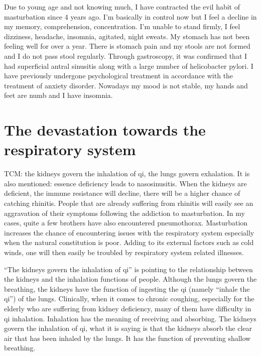 \documentclass[
]{book}
\begin{document}
Due to young age and not knowing much, I have contracted the evil habit of masturbation since 4 years ago. I'm basically in control now but I feel a decline in my memory, comprehension, concentration. I'm unable to stand firmly, I feel dizziness, headache, insomnia, agitated, night sweats. My stomach has not been feeling well for over a year. There is stomach pain and my stools are not formed and I do not pass stool regularly. Through gastroscopy, it was confirmed that I had superficial antral sinusitis along with a large number of helicobacter pylori. I have previously undergone psychological treatment in accordance with the treatment of anxiety disorder. Nowadays my mood is not stable, my hands and feet are numb and I have insomnia.

\hypertarget{the-devastation-towards-the-respiratory-system}{%
\section{The devastation towards the respiratory system}\label{the-devastation-towards-the-respiratory-system}}

TCM: the kidneys govern the inhalation of qi, the lungs govern exhalation. It is also mentioned: essence deficiency leads to nasosinusitis. When the kidneys are deficient, the immune resistance will decline, there will be a higher chance of catching rhinitis. People that are already suffering from rhinitis will easily see an aggravation of their symptoms following the addiction to masturbation. In my cases, quite a few brothers have also encountered pneumothorax. Masturbation increases the chance of encountering issues with the respiratory system especially when the natural constitution is poor. Adding to its external factors such as cold winds, one will then easily be troubled by respiratory system related illnesses.

``The kidneys govern the inhalation of qi'' is pointing to the relationship between the kidneys and the inhalation functions of people. Although the lungs govern the breathing, the kidneys have the function of ingesting the qi (namely ``inhale the qi'') of the lungs. Clinically, when it comes to chronic coughing, especially for the elderly who are suffering from kidney deficiency, many of them have difficulty in qi inhalation. Inhalation has the meaning of receiving and absorbing. The kidneys govern the inhalation of qi, what it is saying is that the kidneys absorb the clear air that has been inhaled by the lungs. It has the function of preventing shallow breathing.
\end{document}
